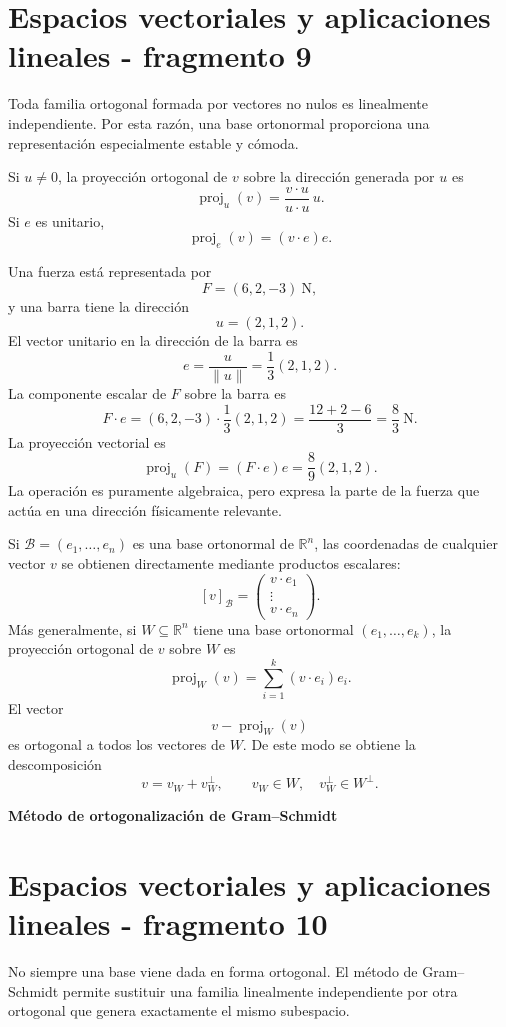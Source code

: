 \section{Espacios vectoriales y aplicaciones lineales - fragmento 9}
Toda familia ortogonal formada por vectores no nulos es linealmente independiente. Por esta razón, una base ortonormal proporciona una representación especialmente estable y cómoda.

Si $u\neq0$, la proyección ortogonal de $v$ sobre la dirección generada por $u$ es
\[
\operatorname{proj}_{u}(v)
=
\frac{v\cdot u}{u\cdot u}\,u.
\]
Si $e$ es unitario,
\[
\operatorname{proj}_{e}(v)=(v\cdot e)e.
\]

\begin{example}
Una fuerza está representada por
\[
F=(6,2,-3)\ \mathrm{N},
\]
y una barra tiene la dirección
\[
u=(2,1,2).
\]
El vector unitario en la dirección de la barra es
\[
e=\frac{u}{\|u\|}=\frac{1}{3}(2,1,2).
\]
La componente escalar de $F$ sobre la barra es
\[
F\cdot e
=
(6,2,-3)\cdot\frac13(2,1,2)
=\frac{12+2-6}{3}
=\frac83\ \mathrm{N}.
\]
La proyección vectorial es
\[
\operatorname{proj}_{u}(F)
=(F\cdot e)e
=\frac{8}{9}(2,1,2).
\]
La operación es puramente algebraica, pero expresa la parte de la fuerza que actúa en una dirección físicamente relevante.
\end{example}

Si $\mathcal B=(e_1,\ldots,e_n)$ es una base ortonormal de $\mathbb{R}^n$, las coordenadas de cualquier vector $v$ se obtienen directamente mediante productos escalares:
\[
\boxed{
[v]_{\mathcal B}
=
\begin{pmatrix}
v\cdot e_1\\
\vdots\\
v\cdot e_n
\end{pmatrix}.
}
\]
Más generalmente, si $W\subseteq\mathbb{R}^n$ tiene una base ortonormal $(e_1,\ldots,e_k)$, la proyección ortogonal de $v$ sobre $W$ es
\[
\boxed{
\operatorname{proj}_{W}(v)
=\sum_{i=1}^{k}(v\cdot e_i)e_i.
}
\]
El vector
\[
v-\operatorname{proj}_{W}(v)
\]
es ortogonal a todos los vectores de $W$. De este modo se obtiene la descomposición
\[
v=v_W+v_W^{\perp},
\qquad
v_W\in W,
\quad
v_W^{\perp}\in W^{\perp}.
\]

\textbf{Método de ortogonalización de Gram--Schmidt}


\section{Espacios vectoriales y aplicaciones lineales - fragmento 10}
No siempre una base viene dada en forma ortogonal. El método de Gram--Schmidt permite sustituir una familia linealmente independiente por otra ortogonal que genera exactamente el mismo subespacio.

